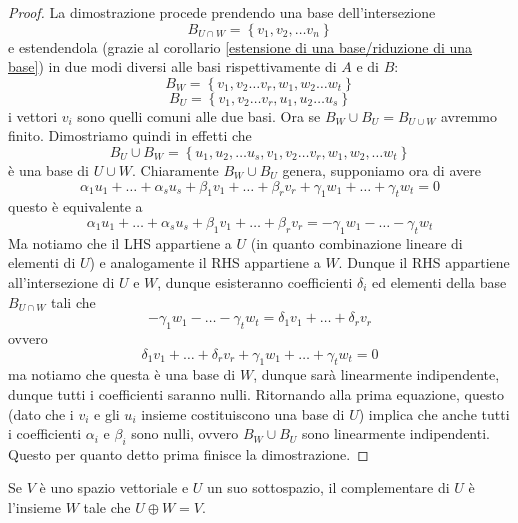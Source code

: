 \documentclass[11pt]{scrartcl}
\begin{document}
	\begin{proof}
		La dimostrazione procede prendendo una base dell'intersezione
		$$B_{U\cap W}=\left\{v_1,v_2,\dots v_n\right\}$$
		e estendendola (grazie al corollario \ref{estensione di una base/riduzione di una base}) in due modi diversi alle basi rispettivamente di $A$ e di $B$:
		$$B_W=\left\{v_1,v_2\dots v_r,w_1,w_2\dots w_t\right\}$$
		$$B_U=\left\{v_1,v_2\dots v_r,u_1,u_2\dots u_s\right\}$$
		i vettori $v_i$ sono quelli comuni alle due basi. Ora se $B_W\cup B_U= B_{U\cup W}$ avremmo finito. Dimostriamo quindi in effetti che
		$$B_U\cup B_W=\left\{u_1,u_2,\dots u_s,v_1,v_2\dots v_r, w_1,w_2,\dots w_t\right\}$$
		è una base di $U\cup W$. Chiaramente $B_W\cup B_U$ genera, supponiamo ora di avere
		$$\alpha_1 u_1+\dots+\alpha_s u_s +\beta_1 v_1 + \dots + \beta_r v_r + \gamma_1 w_1 + \dots + \gamma_t w_t = 0 $$
		questo è equivalente a 
		$$\alpha_1 u_1+\dots+\alpha_s u_s +\beta_1 v_1 + \dots + \beta_r v_r=-\gamma_1 w_1 - \dots - \gamma_t w_t$$
		Ma notiamo che il LHS appartiene a $U$ (in quanto combinazione lineare di elementi di $U$) e analogamente il RHS appartiene a $W$. Dunque il RHS appartiene all'intersezione di $U$ e $W$, dunque esisteranno coefficienti $\delta_i$ ed elementi della base $B_{U\cap W}$ tali che
		$$-\gamma_1 w_1 - \dots - \gamma_t w_t=\delta_1 v_1 + \dots + \delta_r v_r$$
		ovvero
		$$\delta_1 v_1 + \dots + \delta_r v_r + \gamma_1 w_1 + \dots + \gamma_t w_t=0$$
		ma notiamo che questa è una base di $W$, dunque sarà linearmente indipendente, dunque tutti i coefficienti saranno nulli. Ritornando alla prima equazione, questo (dato che i $v_i$ e gli $u_i$ insieme costituiscono una base di $U$) implica che anche tutti i coefficienti $\alpha_i$ e $\beta_i$ sono nulli, ovvero $B_W\cup B_U$ sono linearmente indipendenti. Questo per quanto detto prima finisce la dimostrazione.
	\end{proof}
	\begin{definition}
		Se $V$ è uno spazio vettoriale e $U$ un suo sottospazio, il complementare di $U$ è l'insieme $W$ tale che $U\oplus W=V$. 
	\end{definition}
	
	\newpage
	
\end{document}
